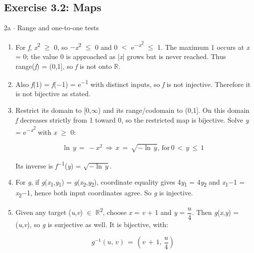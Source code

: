 \documentclass[11pt]{article}
\begin{document}
\begin{keepsection}\subsection{Exercise 3.2: Maps}

\begin{workedbox}{2a \ensuremath{\cdot} Range and one-to-one tests}
\begin{enumerate}
\item For \textit{f}, \textit{x}\textsuperscript{2} \ensuremath{\geq} 0, so \ensuremath{-}\textit{x}\textsuperscript{2} \ensuremath{\leq} 0 and 0 \ensuremath{<} e\textsuperscript{\ensuremath{-}\textit{x}\textsuperscript{2}} \ensuremath{\leq} 1. The maximum 1 occurs at \textit{x} = 0; the value 0 is approached as |\textit{x}| grows but is never reached. Thus range(\textit{f}) = (0,1], so \textit{f} is not onto \ensuremath{\mathbb{R}}.
\item Also \textit{f}(1) = \textit{f}(\ensuremath{-}1) = e\textsuperscript{\ensuremath{-}1} with distinct inputs, so \textit{f} is not injective. Therefore it is not bijective as stated.
\item {}
Restrict its domain to [0,\ensuremath{\infty}) and its range/codomain to (0,1]. On this domain \textit{f} decreases strictly from 1 toward 0, so the restricted map is bijective. Solve \textit{y} = e\textsuperscript{\ensuremath{-}\textit{x}\textsuperscript{2}} with \textit{x} \ensuremath{\geq} 0:

\begin{equation*}\ln \, {y}\, =\, -{x}^{2}\, \Rightarrow \, {x}\, =\, \sqrt{-\ln \, {y}},\, \text{for}\, 0\, <\, {y}\, \leq \, 1\end{equation*}

Its inverse is \textit{f}\textsuperscript{\ensuremath{-}1}(\textit{y}) = \ensuremath{\sqrt{-\ln \, {y}}}.
\item For \textit{g}, if \textit{g}(\textit{x}\textsubscript{1},\textit{y}\textsubscript{1}) = \textit{g}(\textit{x}\textsubscript{2},\textit{y}\textsubscript{2}), coordinate equality gives 4\textit{y}\textsubscript{1} = 4\textit{y}\textsubscript{2} and \textit{x}\textsubscript{1}\ensuremath{-}1 = \textit{x}\textsubscript{2}\ensuremath{-}1, hence both input coordinates agree. So \textit{g} is injective.
\item {}
Given any target (\textit{u},\textit{v}) \ensuremath{\in} \ensuremath{\mathbb{R}}\textsuperscript{2}, choose \textit{x} = \textit{v} + 1 and \textit{y} = {\small\ensuremath{\dfrac{{u}}{4}}}. Then \textit{g}(\textit{x},\textit{y}) = (\textit{u},\textit{v}), so \textit{g} is surjective as well. It is bijective, with:

\begin{equation*}{g}^{-1}({u},\, {v})\, =\, \left({v}\, +\, 1,\, \dfrac{{u}}{4}\right)\end{equation*}
\end{enumerate}
\end{workedbox}

\end{keepsection}
\end{document}
